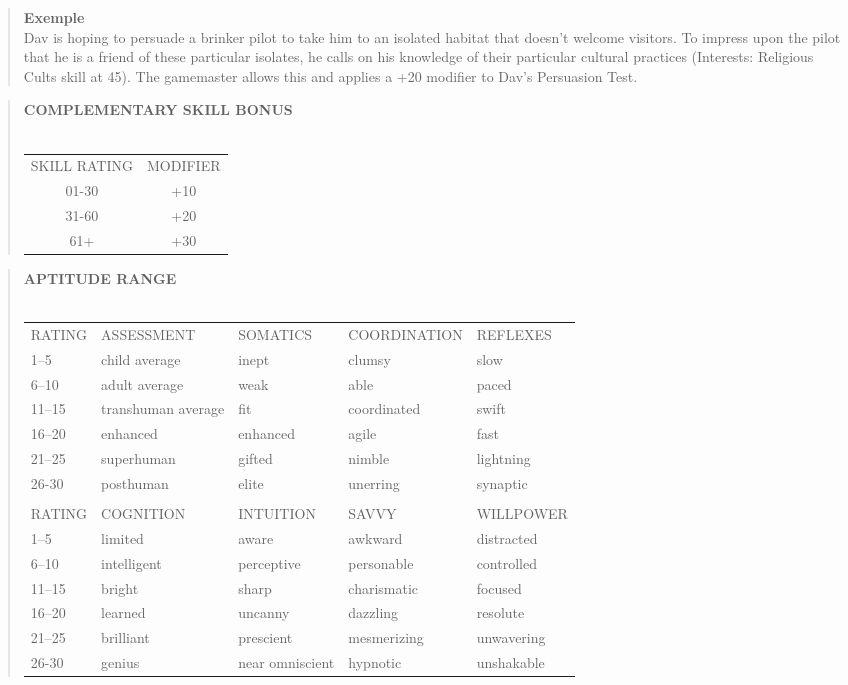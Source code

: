 \begin{quotation} \textbf{Exemple} \\ Dav is hoping to persuade a brinker pilot to take him to an isolated habitat that doesn’t welcome visitors. To impress upon the pilot that he is a friend of these particular isolates, he calls on his knowledge of their particular cultural practices (Interests: Religious Cults skill at 45). The gamemaster allows this and applies a +20 modifier to Dav’s Persuasion Test. \end{quotation} 

\begin{quotation} \textbf{COMPLEMENTARY SKILL BONUS} \\ \\ \begin{tabular}{cc} SKILL RATING &MODIFIER \\ 01-30 &+10 \\ 31-60 &+20 \\ 61+ &+30 \\ \end{tabular} \end{quotation} 



\begin{quotation} \textbf{APTITUDE RANGE} \\ \\ \begin{tabular}{lllll} 

RATING &ASSESSMENT &SOMATICS &COORDINATION &REFLEXES \\ 1–5 &child average &inept &clumsy &slow \\ 6–10 &adult average &weak &able &paced \\ 11–15 &transhuman average &fit &coordinated &swift \\ 16–20 &enhanced &enhanced &agile &fast \\ 21–25 &superhuman &gifted &nimble &lightning \\ 26-30 &posthuman &elite &unerring &synaptic \\ 





\\ RATING &COGNITION &INTUITION &SAVVY &WILLPOWER \\ 1–5 &limited &aware &awkward &distracted \\ 6–10 &intelligent &perceptive &personable &controlled \\ 11–15 &bright &sharp &charismatic &focused \\ 16–20 &learned &uncanny &dazzling &resolute \\ 21–25 &brilliant &prescient &mesmerizing &unwavering \\ 26-30 &genius &near omniscient &hypnotic &unshakable \\ \end{tabular} \end{quotation} 








